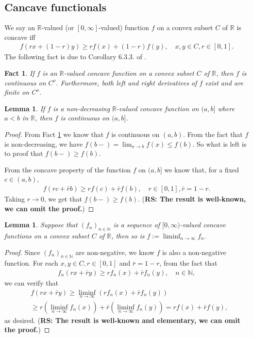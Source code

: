 \documentclass[12pt,a4paper]{amsart}
\numberwithin{equation}{section}
\theoremstyle{plain}
\newtheorem{lem}[thm]{Lemma}
\newtheorem{fact}[thm]{Fact}
\theoremstyle{definition}
\theoremstyle{remark}
\begin{document}
\subsection{Cancave functionals}
We say an $\mathbb R$-valued (or $[0,\infty]$-valued) function $f$ on a convex subset $C$ of $\mathbb R$ is concave iff
\begin{align}
   f(rx+(1-r) y)
 \geq r f(x) + (1-r) f(y),
 \quad x,y \in C, r \in [0,1].
 \end{align}
The following fact is due to Corollary 6.3.3. of \cite{Dudley2002Real}.
\begin{fact} \label{Fact:CC!}
If $f$ is an $\mathbb R$-valued concave function on a convex subset $C$ of $\mathbb R$, then $f$ is continuous on $C^o$.
Furthermore, both left and right derivatives of $f$ exist and are finite on $C^o$.
\end{fact}
\begin{lem} \label{Lemma:CR!}
If $f$ is a non-decreasing $\mathbb R$-valued concave function on $(a,b]$ where $a<b$ in $\mathbb R$, then $f$ is continuous on $(a,b]$.
\end{lem}
\begin{proof}
From Fact \ref{Fact:CC!} we know that $ f $ is continuous on $(a,b)$.
From the fact that $ f $ is non-decreasing, we have $f(b-) = \lim_{x \to b} f(x) \leq f(b)$.
So what is left is to proof that $f(b-) \geq f(b)$.

From the concave property of the function $f$ on $(a,b]$ we know that, for a fixed $c \in (a,b)$,
\begin{align}
 f(rc + \bar r b)
 \geq r f(c) + \bar r f(b),
 \quad r\in [0,1], \bar r = 1 - r.
 \end{align}
Taking $r\to 0$, we get that $f(b-)\geq f(b)$.
({\bf RS: The result is well-known, we can omit the proof.})
\end{proof}
\begin{lem} \label{Lemma:CL!}
Suppose that $(f_n)_{n \in \mathbb N}$ is a sequence of $[0,\infty)$-valued concave functions on a convex subset $C$ of $\mathbb R$, then so is $f:= \liminf_{n\to \infty} f_n.$
\end{lem}
\begin{proof}
Since $(f_n)_{n \in \mathbb N}$ are non-negative, we know $f$ is also a non-negative function.
For each $x,y\in C, r\in [0,1]$ and $\bar r = 1 - r$, from the fact that
\begin{align}
   f_n(rx+\bar r y)
 \geq r f_n(x) + \bar r f_n(y),
  \quad n \in \mathbb N,
 \end{align}
we can verify that
\begin{align}
 & f(rx+ \bar r y)
 \geq \liminf_{n\to \infty} (r f_n(x) + \bar r f_n(y))
 \\&\geq r (\liminf_{n\to \infty} f_n(x)) + \bar r (\liminf_{n\to \infty} f_n(y))
 = rf(x) + \bar r f(y),
 \end{align}
as desired.
({\bf RS: The result is well-known and elementary, we can omit the proof.})
\end{proof}
\end{document}
